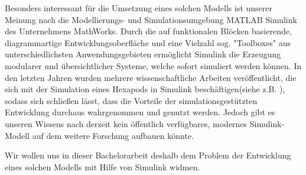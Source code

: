 Besonders interessant für die Umsetzung eines solchen Modells ist unserer Meinung nach die Modellierungs- und Simulationsumgebung MATLAB Simulink des Unternehmens MathWorks.
Durch die auf funktionalen Blöcken basierende, diagrammartige Entwicklungsoberfläche und eine Vielzahl sog. "Toolboxes" aus unterschiedlichsten Anwendungsgebieten ermöglicht Simulink die Erzeugung modularer und übersichtlicher Systeme, welche sofort simuliert werden können.
In den letzten Jahren wurden mehrere wissenschaftliche Arbeiten veröffentlicht, die sich mit der Simulation eines Hexapods in Simulink beschäftigen(siehe z.B. \cite{tanaka2019development, barai2013smart, atify2019propelling}), sodass sich schließen lässt, dass die Vorteile der simulationsgestützten Entwicklung durchaus wahrgenommen und genutzt werden.
Jedoch gibt es unseren Wissens nach derzeit kein öffentlich verfügbares, modernes Simulink-Modell auf dem weitere Forschung aufbauen könnte.

Wir wollen uns in dieser Bachelorarbeit deshalb dem Problem der Entwicklung eines solchen Modells mit Hilfe von Simulink widmen.




